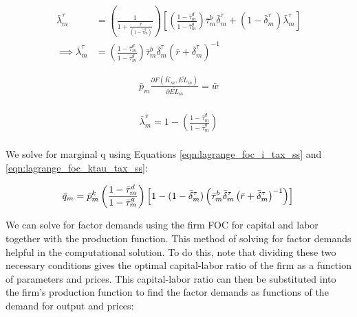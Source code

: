\documentclass[letterpaper,12pt]{article}
\theoremstyle{definition}
\begin{document}
\begin{spacing}{1.5}
\begin{equation}
\label{eqn:lagrange_foc_ktau_tax_ss}
\begin{split}
\bar{\lambda}^{\tau}_{m} &=  \left(\frac{1}{1+\frac{\bar{r}}{(1-\bar{\tau}^{g}_{m})}}\right) \left[ \left(\frac{1-\bar{\tau}^{d}_{m}}{1-\bar{\tau}^{g}_{m}}\right)\bar{\tau}^{b}_{m}\bar{\delta}^{\tau}_{m} + (1-\bar{\delta}^{\tau}_{m})\bar{\lambda}^{\tau}_{m}\right]  \\
\implies \bar{\lambda}^{\tau}_{m} &=\left(\frac{1-\bar{\tau}^{d}_{m}}{1-\bar{\tau}^{g}_{m}}\right)\bar{\tau}^{b}_{m}\bar{\delta}^{\tau}_{m}\left(\bar{r}+\bar{\delta}^{\tau}_{m}\right)^{-1}
\end{split}
\end{equation}

\begin{equation}
\label{eqn:lagrange_foc_l_tax_ss}
\begin{split}
  \bar{p}_{m}\frac{\partial F(\bar{K}_{m},\overline{EL}_{m})}{\partial \overline{EL}_{m}} = \bar{w}  \\
\end{split}
\end{equation}


\begin{equation}
\label{eqn:lagrange_foc_vn_tax2_ss}
\begin{split}
 \bar{\lambda}^{v}_{m} = 1 - \left(\frac{1-\bar{\tau}^{d}_{m}}{1-\bar{\tau}^{g}_{m}}\right)   \\
\end{split}
\end{equation}


We solve for marginal q using Equations \ref{eqn:lagrange_foc_i_tax_ss} and \ref{eqn:lagrange_foc_ktau_tax_ss}:

\begin{equation}
\label{eqn:q_tax_ss}
 \bar{q}_{m} = \bar{p}^{k}_{m}\left(\frac{1-\bar{\tau}^{d}_{m}}{1-\bar{\tau}^{g}_{m}}\right)\left[1 - (1-\bar{\delta}^{\tau}_{m})\left(\bar{\tau}^{b}_{m}\bar{\delta}^{\tau}_{m}\left(\bar{r}+\bar{\delta}^{\tau}_{m}\right)^{-1} \right) \right]  \\
\end{equation}


We can solve for factor demands using the firm FOC for capital and labor together with the production function.  This method of solving for factor demands helpful in the computational solution.  To do this, note that dividing these two necessary conditions gives the optimal capital-labor ratio of the firm as a function of parameters and prices.  This capital-labor ratio can then be substituted into the firm's production function to find the factor demands as functions of the demand for output and prices: 


\end{spacing}
\end{document}
